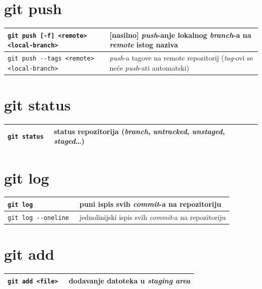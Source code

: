 \documentclass[10pt]{article}
\begin{document}
    \section*{\color{BrickRed} git push}
    \begin{tabular}{|>{\tt}p{9.25cm}|>{}p{15.50cm}|}
        \hline
        git push [-f] <remote> <local-branch>                   & [nasilno] \textit{push}-anje lokalnog \textit{branch}-a na \textit{remote} istog naziva \\ \hline
        git push -{}-tags <remote> <local-branch>               & \textit{push}-a tagove na remote repozitorij (\textit{tag}-ovi se neće \textit{push}-ati automatski) \\ \hline                   
    \end{tabular}

    \section*{\color{BrickRed} git status}
    \begin{tabular}{|>{\tt}p{9.25cm}|>{}p{15.50cm}|}
        \hline
        git status                                          & status repozitorija (\textit{branch}, \textit{untracked}, \textit{unstaged}, \textit{staged}\dots) \\ \hline
    \end{tabular}

    \section*{\color{BrickRed} git log}
    \begin{tabular}{|>{\tt}p{9.25cm}|>{}p{15.50cm}|}
        \hline
        git log                                             & puni ispis svih \textit{commit}-a na repozitoriju \\ \hline 
        git log -{}-oneline                                 & jednolinijski ispis svih \textit{commit}-a na repozitoriju \\ \hline
    \end{tabular}

    \section*{\color{BrickRed} git add}
    \begin{tabular}{|>{\tt}p{9.25cm}|>{}p{15.50cm}|}
        \hline
        git add <file>                                      & dodavanje datoteka u \textit{staging area} \\ \hline
    \end{tabular}
\end{document}
